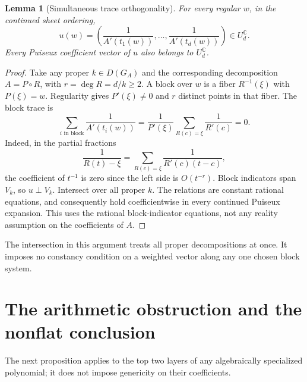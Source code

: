 \documentclass[11pt]{article}
\numberwithin{equation}{section}
\newtheorem{lemma}[theorem]{Lemma}
\theoremstyle{definition}\newtheorem{definition}[theorem]{Definition}
\theoremstyle{remark}\newtheorem{remark}[theorem]{Remark}
\newcommand{\C}{\mathbb C}
\newcommand{\UC}{U_d^{\C}}
\begin{document}
\begin{lemma}[Simultaneous trace orthogonality]\label{lem:trace}
For every regular $w$, in the continued sheet ordering,
\begin{equation}\label{eq:inverse-derivative}
 u(w)=\left(\frac1{A'(t_1(w))},\ldots,\frac1{A'(t_d(w))}\right)\in\UC.
\end{equation}
Every Puiseux coefficient vector of $u$ also belongs to $\UC$.
\end{lemma}
\begin{proof}
Take any proper $k\in D(G_A)$ and the corresponding decomposition
$A=P\circ R$, with $r=\deg R=d/k\ge2$. A block over $w$ is a fiber
$R^{-1}(\xi)$ with $P(\xi)=w$. Regularity gives $P'(\xi)\ne0$ and
$r$ distinct points in that fiber. The block trace is
\begin{equation}\label{eq:block-trace}
 \sum_{i\text{ in block}}\frac1{A'(t_i(w))}
 =\frac1{P'(\xi)}\sum_{R(c)=\xi}\frac1{R'(c)}=0.
\end{equation}
Indeed, in the partial fractions
\[
 \frac1{R(t)-\xi}=\sum_{R(c)=\xi}\frac1{R'(c)(t-c)},
\]
the coefficient of $t^{-1}$ is zero since the left side is $O(t^{-r})$.
Block indicators span $V_k$, so $u\perp V_k$. Intersect over all proper
$k$. The relations are constant rational equations, and consequently
hold coefficientwise in every continued Puiseux expansion.
This uses the rational block-indicator equations, not any reality
assumption on the coefficients of $A$.
\end{proof}
The intersection in this argument treats all proper decompositions at
once. It imposes no constancy condition on a weighted vector along any
one chosen block system.

\section{The arithmetic obstruction and the nonflat conclusion}\label{sec:arithmetic}
The next proposition applies to the top two layers of any algebraically
specialized polynomial; it does not impose genericity on their coefficients.
\end{document}
